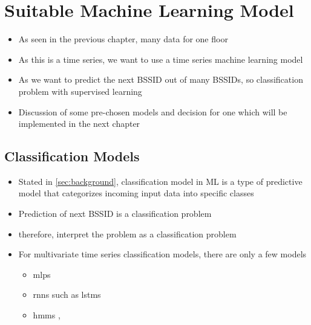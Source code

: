 \chapter{Suitable Machine Learning Model}\label{sec:ml-algo}


\begin{itemize}
    \item As seen in the previous chapter, many data for one floor 
    \item As this is a time series, we want to use a time series machine learning model
    \item As we want to predict the next BSSID out of many BSSIDs, so classification problem with supervised learning
    \item Discussion of some pre-chosen models and decision for one which will be implemented in the next chapter
\end{itemize}

\section{Classification Models}
\begin{itemize}
    \item Stated in \cref{sec:background}, classification model in ML is a type of predictive model that categorizes incoming input data into specific classes
    \item Prediction of next BSSID is a classification problem
    \item therefore, interpret the problem as a classification problem
    \item For multivariate time series classification models, there are only a few models
    \begin{itemize}
        \item \acp{mlp} \cite{TSC}
        \item \acp{rnn} such as \acp{lstm}\cite{lstm-hochreiter}
        \item \acp{hmm} \cite{hmm-movement-prediction}, 
    \end{itemize}
\end{itemize}


